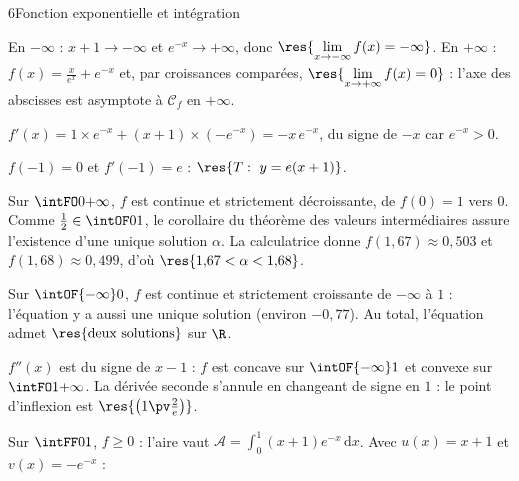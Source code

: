 \begin{corrigeBac}{6}{Fonction exponentielle et intégration}
\begin{questions}
  \item En $-\infty$ : $x+1\to-\infty$ et $e^{-x}\to+\infty$, donc $\res{\lim\limits_{x\to-\infty}f(x)=-\infty}$. En $+\infty$ :
    $f(x)=\frac{x}{e^{x}}+e^{-x}$ et, par croissances comparées, $\res{\lim\limits_{x\to+\infty}f(x)=0}$ : l'axe des abscisses est
    asymptote à $\mathcal{C}_f$ en $+\infty$. \pts{1 pt}
  \item $f'(x)=1\times e^{-x}+(x+1)\times\left(-e^{-x}\right)=-x\,e^{-x}$, du signe de $-x$ car $e^{-x}>0$.
\begin{center}
\begin{tableau}
\end{tableau}
\end{center}
  \item $f(-1)=0$ et $f'(-1)=e$ : $\res{T:\ y=e(x+1)}$. 
\end{questions}
\begin{questions}[resume]
  \item Sur $\intFO0{+\infty}$, $f$ est continue et strictement décroissante, de $f(0)=1$ vers $0$. Comme $\frac12\in\intOF01$, le
    corollaire du théorème des valeurs intermédiaires assure l'existence d'une unique solution $\alpha$. La calculatrice donne
    $f(1{,}67)\approx0{,}503$ et $f(1{,}68)\approx0{,}499$, d'où $\res{1{,}67<\alpha<1{,}68}$. \pts{1 pt}
  \item Sur $\intOF{-\infty}0$, $f$ est continue et strictement croissante de $-\infty$ à $1$ : l'équation y a aussi une unique solution
    (environ $-0{,}77$). Au total, l'équation admet $\res{\text{deux solutions}}$ sur $\R$. 
\end{questions}
\begin{questions}[resume]
  \item $f''(x)$ est du signe de $x-1$ : $f$ est concave sur $\intOF{-\infty}1$ et convexe sur $\intFO1{+\infty}$. La dérivée seconde
    s'annule en changeant de signe en $1$ : le point d'inflexion est $\res{\left(1\pv\tfrac2e\right)}$. 
  \item Sur $\intFF01$, $f\geq0$ : l'aire vaut $\mathcal{A}=\int_0^1(x+1)e^{-x}\,\mathrm{d}x$. Avec $u(x)=x+1$ et $v(x)=-e^{-x}$ :

\end{questions}
\end{corrigeBac}
